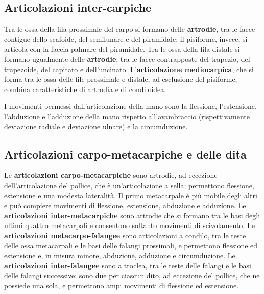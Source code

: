 \subsection{Articolazioni inter-carpiche}

Tra le ossa della fila prossimale del carpo si formano delle
\textbf{artrodie}, tra le facce contigue dello scafoide, del semilunare e
del piramidale; il pisiforme, invece, si articola con la faccia palmare
del piramidale. Tra le ossa della fila distale si formano ugualmente delle
\textbf{artrodie}, tra le facce contrapposte del trapezio, del trapezoide,
del capitato e dell'uncinato. L'\textbf{articolazione mediocarpica}, che si
forma tra le ossa delle file prossimale e distale, ad esclusione del
pisiforme, combina caratteristiche di artrodia e di condiloidea.

I movimenti permessi dall'articolazione della mano sono la flessione,
l'estensione, l'abduzione e l'adduzione della mano rispetto
all'avambraccio (rispettivamente deviazione radiale e deviazione ulnare) e
la circumduzione.

\subsection{Articolazioni carpo-metacarpiche e delle dita}

Le \textbf{articolazioni carpo-metacarpiche} sono artrodie, ad eccezione
dell'articolazione del pollice, che è un'articolazione a sella; permettono
flessione, estensione e una modesta lateralità. Il primo metacarpale è più
mobile degli altri e può compiere movimenti di flessione, estensione,
abduzione e adduzione. Le \textbf{articolazioni inter-metacarpiche} sono
artrodie che si formano tra le basi degli ultimi quattro metacarpali e
consentono soltanto movimenti di scivolamento. Le \textbf{articolazioni
metacarpo-falangee} sono articolazioni a condilo, tra le teste delle ossa
metacarpali e le basi delle falangi prossimali, e permettono flessione ed
estensione e, in misura minore, abduzione, adduzione e circumduzione. Le
\textbf{articolazioni inter-falangee} sono a troclea, tra le teste delle
falangi e le basi delle falangi successive: sono due per ciascun dito, ad
eccezione del pollice, che ne possiede una sola, e permettono ampi
movimenti di flessione ed estensione.
